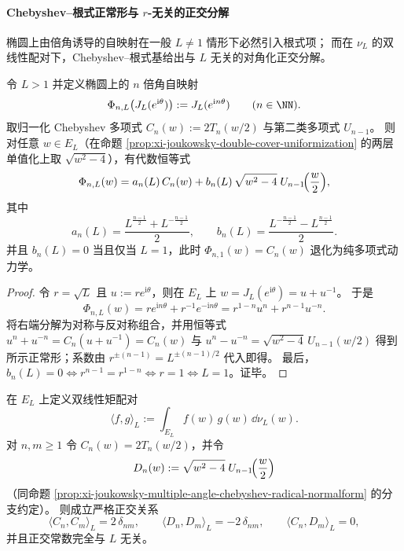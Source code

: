 \paragraph{Chebyshev–根式正常形与 \texorpdfstring{$r$}{r}-无关的正交分解}
椭圆上由倍角诱导的自映射在一般 \(L\neq 1\) 情形下必然引入根式项；
而在 \(\nu_L\) 的双线性配对下，Chebyshev–根式基给出与 \(L\) 无关的对角化正交分解。

\begin{proposition}\label{prop:xi-joukowsky-multiple-angle-chebyshev-radical-normalform}
令 \(L>1\) 并定义椭圆上的 \(n\) 倍角自映射
\[
\Phi_{n,L}\bigl(J_L(e^{\mathrm{i}\theta})\bigr):=J_L(e^{\mathrm{i}n\theta})
\qquad(n\in\NN).
\]
取归一化 Chebyshev 多项式 \(C_n(w):=2T_n(w/2)\) 与第二类多项式 \(U_{n-1}\)。
则对任意 \(w\in E_L\)（在命题 \ref{prop:xi-joukowsky-double-cover-uniformization} 的两层单值化上取 \(\sqrt{w^2-4}\)），有代数恒等式
\[
\Phi_{n,L}(w)=a_n(L)\,C_n(w)+b_n(L)\,\sqrt{w^2-4}\;U_{n-1}\!\Bigl(\frac{w}{2}\Bigr),
\]
其中
\[
a_n(L)=\frac{L^{\frac{n-1}{2}}+L^{-\frac{n-1}{2}}}{2},
\qquad
b_n(L)=\frac{L^{-\frac{n-1}{2}}-L^{\frac{n-1}{2}}}{2}.
\]
并且 \(b_n(L)=0\) 当且仅当 \(L=1\)，此时 \(\Phi_{n,1}(w)=C_n(w)\) 退化为纯多项式动力学。
\end{proposition}

\begin{proof}
令 \(r=\sqrt{L}\) 且 \(u:=r e^{\mathrm{i}\theta}\)，则在 \(E_L\) 上 \(w=J_L(e^{\mathrm{i}\theta})=u+u^{-1}\)。
于是
\[
\Phi_{n,L}(w)=r e^{\mathrm{i}n\theta}+r^{-1}e^{-\mathrm{i}n\theta}=r^{1-n}u^n+r^{n-1}u^{-n}.
\]
将右端分解为对称与反对称组合，并用恒等式 \(u^n+u^{-n}=C_n(u+u^{-1})=C_n(w)\) 与
\(
u^n-u^{-n}=\sqrt{w^2-4}\,U_{n-1}(w/2)
\)
得到所示正常形；系数由 \(r^{\pm(n-1)}=L^{\pm(n-1)/2}\) 代入即得。
最后，\(b_n(L)=0\iff r^{n-1}=r^{1-n}\iff r=1\iff L=1\)。证毕。
\end{proof}

\begin{theorem}\label{thm:xi-joukowsky-chebyshev-orthogonality-L-invariant}
在 \(E_L\) 上定义双线性矩配对
\[
\langle f,g\rangle_L:=\int_{E_L} f(w)\,g(w)\,\dd\nu_L(w).
\]
对 \(n,m\ge 1\) 令 \(C_n(w)=2T_n(w/2)\)，并令
\[
D_n(w):=\sqrt{w^2-4}\;U_{n-1}\!\Bigl(\frac{w}{2}\Bigr)
\]
（同命题 \ref{prop:xi-joukowsky-multiple-angle-chebyshev-radical-normalform} 的分支约定）。
则成立严格正交关系
\[
\langle C_n,C_m\rangle_L=2\,\delta_{nm},
\qquad
\langle D_n,D_m\rangle_L=-2\,\delta_{nm},
\qquad
\langle C_n,D_m\rangle_L=0,
\]
并且正交常数完全与 \(L\) 无关。
\end{theorem}

